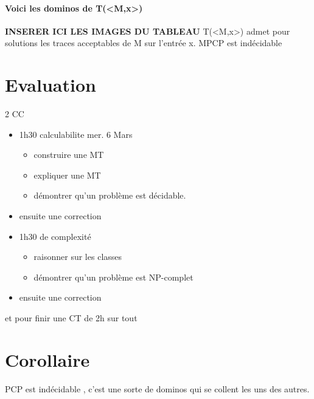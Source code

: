\documentclass{article}
\begin{document}
{{\paragraph{Voici les dominos de T(<M,x>)}
\textbf{INSERER ICI LES IMAGES DU TABLEAU}
T(<M,x>) admet pour solutions les traces acceptables de M sur l'entrée x. MPCP est indécidable


\section{Evaluation}
2 CC
\begin{itemize}
\item 1h30 calculabilite mer. 6 Mars
\begin{itemize}
\item construire une MT
\item expliquer une MT
\item démontrer qu'un problème est décidable.
\end{itemize}
\item ensuite une correction
\item 1h30 de complexité
\begin{itemize}
\item raisonner sur les classes
\item démontrer qu'un problème est NP-complet
\end{itemize}
\item ensuite une correction

\end{itemize}
et pour finir une CT de 2h sur tout
\newpage
\section{Corollaire}
 PCP est indécidable , c'est une sorte de dominos qui se collent les uns des autres.\\\\
}}
\end{document}
